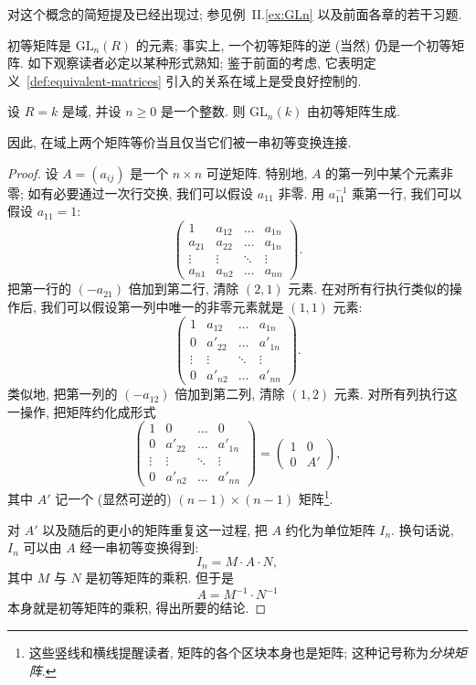 对这个概念的简短提及已经出现过; 参见例~II.\ref{ex:GLn} 以及前面各章的若干习题.

初等矩阵是 $\mathrm{GL}_n(R)$ 的元素; 事实上, 一个初等矩阵的逆 (当然) 仍是一个初等矩阵. 如下观察读者必定以某种形式熟知; 鉴于前面的考虑, 它表明定义~\ref{def:equivalent-matrices} 引入的关系在域上是受良好控制的.

\begin{proposition}\label{prop:GL-generated-by-elementary-field}
设 $R=k$ 是域, 并设 $n\ge0$ 是一个整数. 则 $\mathrm{GL}_n(k)$ 由初等矩阵生成.

因此, 在域上两个矩阵等价当且仅当它们被一串初等变换连接.
\end{proposition}

\begin{proof}
设 $A=(a_{ij})$ 是一个 $n\times n$ 可逆矩阵. 特别地, $A$ 的第一列中某个元素非零; 如有必要通过一次行交换, 我们可以假设 $a_{11}$ 非零. 用 $a_{11}^{-1}$ 乘第一行, 我们可以假设 $a_{11}=1$:
\[
\begin{pmatrix}
1 & a_{12} & \dots & a_{1n}\\
a_{21} & a_{22} & \dots & a_{1n}\\
\vdots & \vdots & \ddots & \vdots\\
a_{n1} & a_{n2} & \dots & a_{nn}
\end{pmatrix}.
\]
把第一行的 $(-a_{21})$ 倍加到第二行, 清除 $(2,1)$ 元素. 在对所有行执行类似的操作后, 我们可以假设第一列中唯一的非零元素就是 $(1,1)$ 元素:
\[
\begin{pmatrix}
1 & a_{12} & \dots & a_{1n}\\
0 & a'_{22} & \dots & a'_{1n}\\
\vdots & \vdots & \ddots & \vdots\\
0 & a'_{n2} & \dots & a'_{nn}
\end{pmatrix}.
\]
类似地, 把第一列的 $(-a_{12})$ 倍加到第二列, 清除 $(1,2)$ 元素. 对所有列执行这一操作, 把矩阵约化成形式
\[
\begin{pmatrix}
1 & 0 & \dots & 0\\
0 & a'_{22} & \dots & a'_{1n}\\
\vdots & \vdots & \ddots & \vdots\\
0 & a'_{n2} & \dots & a'_{nn}
\end{pmatrix}
= \left(\begin{array}{c|c} 1 & 0\\ \hline 0 & A'\end{array}\right),
\]
其中 $A'$ 记一个 (显然可逆的) $(n-1)\times(n-1)$ 矩阵\footnote{这些竖线和横线提醒读者, 矩阵的各个区块本身也是矩阵; 这种记号称为\emph{分块矩阵}.}.

对 $A'$ 以及随后的更小的矩阵重复这一过程, 把 $A$ 约化为单位矩阵 $I_n$. 换句话说, $I_n$ 可以由 $A$ 经一串初等变换得到:
\[
I_n = M\cdot A\cdot N,
\]
其中 $M$ 与 $N$ 是初等矩阵的乘积. 但于是
\[
A = M^{-1}\cdot N^{-1}
\]
本身就是初等矩阵的乘积, 得出所要的结论.
\end{proof}

